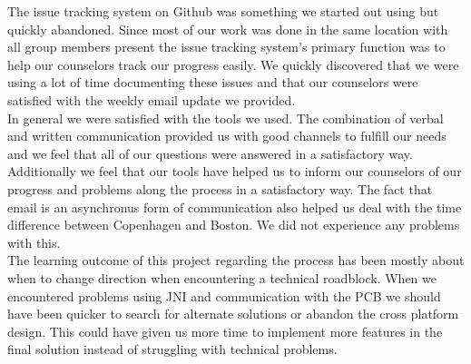 The issue tracking system on Github was something we started out using but quickly abandoned. Since most of our work was done in the same location with all group members present the issue tracking system's primary function was to help our counselors track our progress easily. We quickly discovered that we were using a lot of time documenting these issues and that our counselors were satisfied with the weekly email update we provided. \\

In general we were satisfied with the tools we used. The combination of verbal and written communication provided us with good channels to fulfill our needs and we feel that all of our questions were answered in a satisfactory way. Additionally we feel that our tools have helped us to inform our counselors of our progress and problems along the process in a satisfactory way. The fact that email is an asynchronus form of communication also helped us deal with the time difference between Copenhagen and Boston. We did not experience any problems with this. \\

The learning outcome of this project regarding the process has been mostly about when to change direction when encountering a technical roadblock. When we encountered problems using JNI and communication with the PCB we should have been quicker to search for alternate solutions or abandon the cross platform design. This could have given us more time to implement more features in the final solution instead of struggling with technical problems.